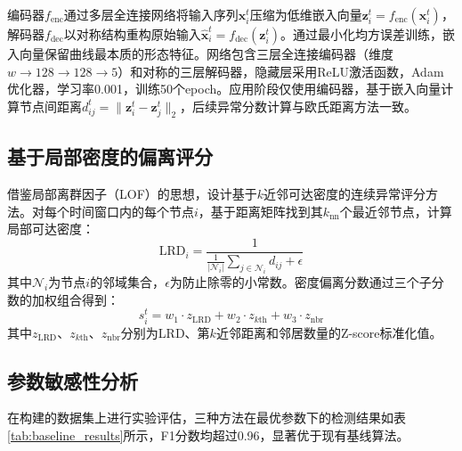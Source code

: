 \documentclass[10.5pt,a4paper,twocolumn]{ctexart}
\begin{document}
编码器$f_{\text{enc}}$通过多层全连接网络将输入序列$\mathbf{x}_i^t$压缩为低维嵌入向量$\mathbf{z}_i^t = f_{\text{enc}}(\mathbf{x}_i^t)$，解码器$f_{\text{dec}}$以对称结构重构原始输入$\hat{\mathbf{x}}_i^t = f_{\text{dec}}(\mathbf{z}_i^t)$。通过最小化均方误差训练，嵌入向量保留曲线最本质的形态特征。网络包含三层全连接编码器（维度$w \to 128 \to 128 \to 5$）和对称的三层解码器，隐藏层采用ReLU激活函数，Adam优化器，学习率0.001，训练50个epoch。应用阶段仅使用编码器，基于嵌入向量计算节点间距离$d_{ij}^t = \|\mathbf{z}_i^t - \mathbf{z}_j^t\|_2$，后续异常分数计算与欧氏距离方法一致。

\subsection{基于局部密度的偏离评分}\label{subsec:density}

借鉴局部离群因子（LOF）的思想，设计基于$k$近邻可达密度的连续异常评分方法。对每个时间窗口内的每个节点$i$，基于距离矩阵找到其$k_{\text{nn}}$个最近邻节点，计算局部可达密度：
\begin{equation}
    \text{LRD}_i = \frac{1}{\frac{1}{|\mathcal{N}_i|}\sum_{j \in \mathcal{N}_i} d_{ij} + \epsilon}
\end{equation}
其中$\mathcal{N}_i$为节点$i$的邻域集合，$\epsilon$为防止除零的小常数。密度偏离分数通过三个子分数的加权组合得到：
\begin{equation}\label{eq:density_score}
    s_i^t = w_1 \cdot z_{\text{LRD}} + w_2 \cdot z_{k\text{th}} + w_3 \cdot z_{\text{nbr}}
\end{equation}
其中$z_{\text{LRD}}$、$z_{k\text{th}}$、$z_{\text{nbr}}$分别为LRD、第$k$近邻距离和邻居数量的Z-score标准化值。

\subsection{参数敏感性分析}\label{subsec:sensitivity}

在构建的数据集上进行实验评估，三种方法在最优参数下的检测结果如表\ref{tab:baseline_results}所示，F1分数均超过0.96，显著优于现有基线算法。
\end{document}
